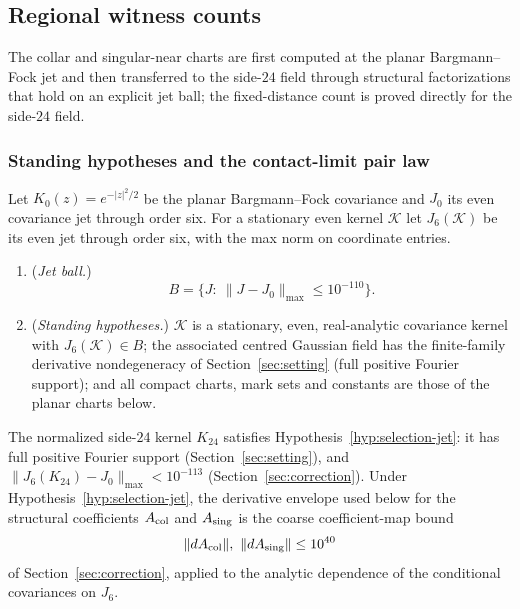 \subsection{Regional witness counts}\label{ssec:selection-witness}

The collar and singular-near charts are first computed at the planar Bargmann--Fock jet and then transferred to the side-$24$ field through structural factorizations that hold on an explicit jet ball; the fixed-distance count is proved directly for the side-$24$ field.

\subsubsection{Standing hypotheses and the contact-limit pair law}

Let $K_0(z)=e^{-|z|^2/2}$ be the planar Bargmann--Fock covariance and $J_0$ its even covariance jet through order six. For a stationary even kernel $\mathcal K$ let $J_6(\mathcal K)$ be its even jet through order six, with the max norm on coordinate entries.

\begin{hypothesis}\label{hyp:selection-jet}
\begin{enumerate}[(1)]
\item (\emph{Jet ball.})
\begin{equation}\label{eq:selection-jetball}
B=\bigl\{J:\ \|J-J_0\|_{\max}\le10^{-110}\bigr\}.
\end{equation}
\item (\emph{Standing hypotheses.}) $\mathcal K$ is a stationary, even, real-analytic covariance kernel with $J_6(\mathcal K)\in B$; the associated centred Gaussian field has the finite-family derivative nondegeneracy of Section~\ref{sec:setting} (full positive Fourier support); and all compact charts, mark sets and constants are those of the planar charts below.
\end{enumerate}
\end{hypothesis}

\begin{remark}\label{rem:selection-side24}
The normalized side-$24$ kernel $K_{24}$ satisfies Hypothesis~\ref{hyp:selection-jet}: it has full positive Fourier support (Section~\ref{sec:setting}), and $\|J_6(K_{24})-J_0\|_{\max}<10^{-113}$ (Section~\ref{sec:correction}). Under Hypothesis~\ref{hyp:selection-jet}, the derivative envelope used below for the structural coefficients $A_{\rm col}$ and $A_{\rm sing}$ is the coarse coefficient-map bound
\[
\|dA_{\rm col}\|,\ \|dA_{\rm sing}\|\le10^{40}
\]
of Section~\ref{sec:correction}, applied to the analytic dependence of the conditional covariances on $J_6$.
\end{remark}

